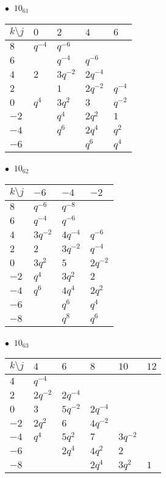 %
\begin{minipage}{\linewidth}
$\bullet\ $ $10_{61}$ \vspace{0.5em} \\
\begin{tabular}{l|llll}
$k \setminus j$ & $0$ & $2$ & $4$ & $6$ \\
\hline
$8$ & $q^{-4}$ & $q^{-6}$ &  &  \\
$6$ &  & $q^{-4}$ & $q^{-6}$ &  \\
$4$ & $2$ & $3q^{-2}$ & $2q^{-4}$ &  \\
$2$ &  & $1$ & $2q^{-2}$ & $q^{-4}$ \\
$0$ & $q^{4}$ & $3q^{2}$ & $3$ & $q^{-2}$ \\
$-2$ &  & $q^{4}$ & $2q^{2}$ & $1$ \\
$-4$ &  & $q^{6}$ & $2q^{4}$ & $q^{2}$ \\
$-6$ &  &  & $q^{6}$ & $q^{4}$ \\
\end{tabular}
\vspace{2em}
\end{minipage}
%
\begin{minipage}{\linewidth}
$\bullet\ $ $10_{62}$ \vspace{0.5em} \\
\begin{tabular}{l|lll}
$k \setminus j$ & $-6$ & $-4$ & $-2$ \\
\hline
$8$ & $q^{-6}$ & $q^{-8}$ &  \\
$6$ & $q^{-4}$ & $q^{-6}$ &  \\
$4$ & $3q^{-2}$ & $4q^{-4}$ & $q^{-6}$ \\
$2$ & $2$ & $3q^{-2}$ & $q^{-4}$ \\
$0$ & $3q^{2}$ & $5$ & $2q^{-2}$ \\
$-2$ & $q^{4}$ & $3q^{2}$ & $2$ \\
$-4$ & $q^{6}$ & $4q^{4}$ & $2q^{2}$ \\
$-6$ &  & $q^{6}$ & $q^{4}$ \\
$-8$ &  & $q^{8}$ & $q^{6}$ \\
\end{tabular}
\vspace{2em}
\end{minipage}
%
\begin{minipage}{\linewidth}
$\bullet\ $ $10_{63}$ \vspace{0.5em} \\
\begin{tabular}{l|lllll}
$k \setminus j$ & $4$ & $6$ & $8$ & $10$ & $12$ \\
\hline
$4$ & $q^{-4}$ &  &  &  &  \\
$2$ & $2q^{-2}$ & $2q^{-4}$ &  &  &  \\
$0$ & $3$ & $5q^{-2}$ & $2q^{-4}$ &  &  \\
$-2$ & $2q^{2}$ & $6$ & $4q^{-2}$ &  &  \\
$-4$ & $q^{4}$ & $5q^{2}$ & $7$ & $3q^{-2}$ &  \\
$-6$ &  & $2q^{4}$ & $4q^{2}$ & $2$ &  \\
$-8$ &  &  & $2q^{4}$ & $3q^{2}$ & $1$ \\
\end{tabular}
\vspace{2em}
\end{minipage}

